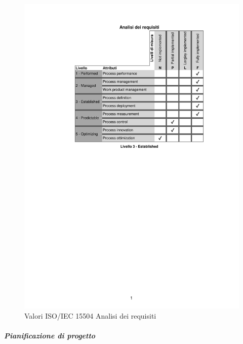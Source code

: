 \begin{figure}[H]
	\centering
	\includegraphics[scale=1]{images/resoconto/RR/analisideirequisiti-RR.pdf}
	\caption{Valori ISO/IEC 15504 Analisi dei requisiti}
\end{figure}
\newpage
\subparagraph{Pianificazione di progetto}
\noindent
